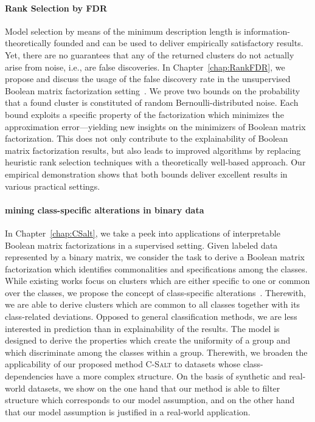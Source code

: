 \paragraph{Rank Selection by FDR}
Model selection by means of the minimum description length is information-theoretically founded and can be used to deliver empirically satisfactory results.
Yet, there are no guarantees that any of the returned clusters do not actually arise from noise, i.e., are false discoveries. In Chapter~\ref{chap:RankFDR}, we propose and discuss the usage of the false discovery rate in the unsupervised Boolean matrix factorization setting~\citep{hess2018trustworthy}. We prove two bounds on the probability that a found cluster is constituted of random Bernoulli-distributed noise. Each bound exploits a specific property of the factorization which minimizes the approximation error---yielding new insights on the minimizers of Boolean matrix factorization. This does not only contribute to the explainability of Boolean matrix factorization results, but also leads to improved algorithms by replacing heuristic rank selection techniques with a theoretically well-based approach. Our empirical demonstration shows that both bounds deliver excellent results in various practical settings.
\paragraph{mining class-specific alterations in binary data} In Chapter~\ref{chap:CSalt}, we take a peek into applications of interpretable Boolean matrix factorizations in a supervised setting.
Given labeled data represented by a binary matrix, we consider the task to derive a Boolean matrix factorization which identifies commonalities and specifications among the classes. While existing works focus on clusters which are either specific to one or common over the classes, we propose the concept of class-specific alterations~\citep{hess2017csalt}. Therewith, we are able to derive clusters which are common to all classes together with its class-related deviations. Opposed to general classification methods, we are less interested in prediction than in explainability of the results. The model is designed to derive the properties which create the uniformity of a group and which discriminate among the classes within a group. Therewith, we broaden the applicability of our proposed method \textsc{C-Salt} to datasets whose class-dependencies have a more complex structure. On the basis of synthetic and real-world datasets, we show on the one hand that our method is  able to filter structure which corresponds to our model assumption, and on the other hand that our model assumption is justified in a real-world application.

